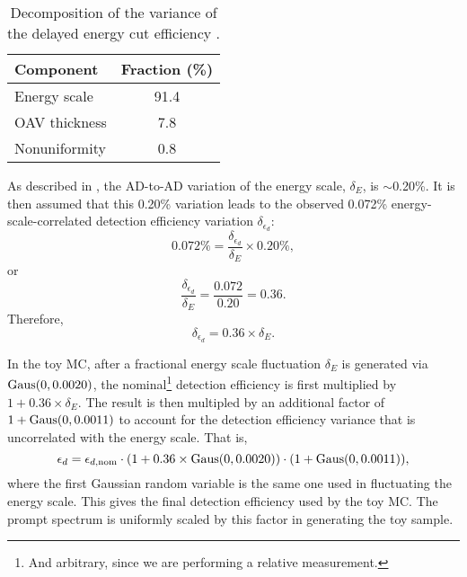 \documentclass[../thesis.tex]{subfiles}
\begin{document}
\begin{table}[ht]
  \begin{tabular}{lc}
    \toprule
    Component & Fraction (\%) \\
    \midrule
    Energy scale & 91.4 \\
    OAV thickness & 7.8 \\
    Nonuniformity & 0.8 \\
    \bottomrule
  \end{tabular}
  \caption{Decomposition of the variance of the delayed energy cut efficiency \cite{loganDetEff}.}
  \label{tab:delayedEffVariance}
\end{table}

As described in \cite[Sec.\@ III B 5 b]{An_2017}, the AD-to-AD variation of the energy scale, $\delta_E$, is $\sim$0.20\%. It is then assumed that this 0.20\% variation leads to the observed 0.072\% energy-scale-correlated detection efficiency variation $\delta_{\epsilon_d}$:
\begin{equation}
  0.072\% = \frac{\delta_{\epsilon_d}}{\delta_E} \times 0.20\%,
\end{equation}
or
\begin{equation}
  \frac{\delta_{\epsilon_d}}{\delta_E} = \frac{0.072}{0.20} = 0.36.
\end{equation}
Therefore,
\begin{equation}
  \delta_{\epsilon_d} = 0.36 \times \delta_E.
\end{equation}

In the toy MC, after a fractional energy scale fluctuation $\delta_E$ is generated via $\operatorname{Gaus}(0, 0.0020)$, the nominal\footnote{And arbitrary, since we are performing a relative measurement.} detection efficiency is first multiplied by $1 + 0.36 \times \delta_E$. The result is then multipled by an additional factor of $1 + \operatorname{Gaus}(0, 0.0011)$ to account for the detection efficiency variance that is uncorrelated with the energy scale. That is,
\begin{equation}
  \epsilon_d = \epsilon_{d,\mathrm{nom}} \cdot (1 + 0.36 \times \operatorname{Gaus}(0, 0.0020)) \cdot (1 + \operatorname{Gaus}(0, 0.0011)),
\end{equation}
where the first Gaussian random variable is the same one used in fluctuating the energy scale. This gives the final detection efficiency used by the toy MC. The prompt spectrum is uniformly scaled by this factor in generating the toy sample.
\end{document}
